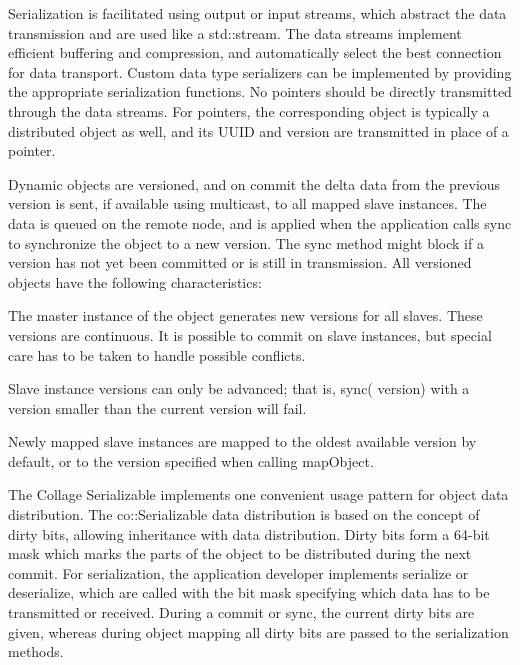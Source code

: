 Serialization is facilitated using output or input streams, which abstract the
data transmission and are used like a \textsf{std::stream}. The data streams
implement efficient buffering and compression, and automatically select the best
connection for data transport. Custom data type serializers can be implemented
by providing the appropriate serialization functions. No pointers should be
directly transmitted through the data streams. For pointers, the corresponding
object is typically a distributed object as well, and its UUID and version are
transmitted in place of a pointer.

Dynamic objects are versioned, and on \textsf{commit} the delta data from the
previous version is sent, if available using multicast, to all mapped slave
instances. The data is queued on the remote node, and is applied when the
application calls \textsf{sync} to synchronize the object to a new version. The
\textsf{sync} method might block if a version has not yet been committed or is
still in transmission. All versioned objects have the following characteristics:

\begin{compactitem}
\item The master instance of the object generates new versions for all
  slaves. These versions are continuous. It is possible to commit on slave
  instances, but special care has to be taken to handle possible
  conflicts.
\item Slave instance versions can only be advanced; that is, \textsf{sync(
  version)} with a version smaller than the current version will fail.
\item Newly mapped slave instances are mapped to the oldest available
  version by default, or to the version specified when calling
  \textsf{mapObject}.
\end{compactitem}

\label{sec:Serializable}The \textsf{Collage} Serializable implements one
convenient usage pattern for object data distribution. The
\textsf{co::Serializable} data distribution is based on the concept of dirty
bits, allowing inheritance with data distribution. Dirty bits form a 64-bit mask
which marks the parts of the object to be distributed during the next commit.
For serialization, the application developer implements \textsf{serialize} or
\textsf{deserialize}, which are called with the bit mask specifying which data
has to be transmitted or received. During a commit or sync, the current dirty
bits are given, whereas during object mapping all dirty bits are passed to the
serialization methods.

